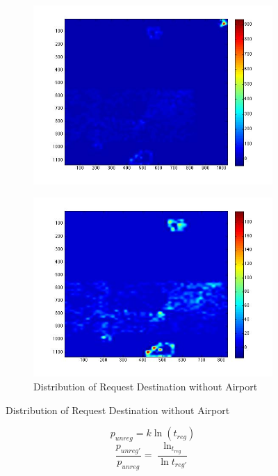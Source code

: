 \documentclass[titlepage]{article}
\begin{document}
\begin{figure}[H]
\begin{subfigure}{0.48\textwidth}
      \centering
      \includegraphics[width=1.1\textwidth]{dest_with_airport.jpg}
      \end{subfigure}\quad
      \begin{subfigure}{0.48\textwidth}
	\caption{Distribution of Request Destination without Airport}
      \centering
      \includegraphics[width=1.1\textwidth]{dest_without_airport.jpg}
      \end{subfigure}
 \end{figure}

$$p_{unreg} = k \ln (t_{reg})$$
$$\frac{p_{unreg'}}{p_{unreg}}  = \frac{\ln_{t_{reg}}}{ \ln{t_{reg'}}}$$
\end{document}
